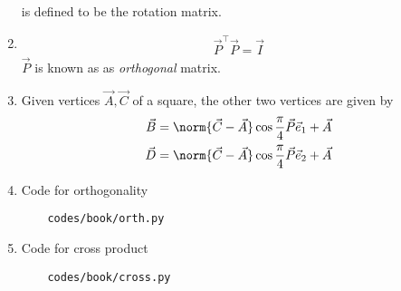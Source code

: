 \begin{enumerate}[label=\thesubsection.\arabic*.,ref=\thesubsection.\theenumi]
\begin{align}
{}
\end{align}
is defined to be the rotation matrix. 
\item 
\begin{align}
	\vec{P}^{\top} \vec{P} = \vec{I}
\end{align}
		$\vec{P}$ is known as as {\em orthogonal} matrix.
\item Given vertices $\vec{A}, \vec{C}$ of a square, the other two vertices are given by
\begin{align}
\begin{split}
	\vec{B} = \norm{\vec{C}-\vec{A}}\cos \frac{\pi}{4}\vec{P}\vec{e}_1+\vec{A}
	\\
	\vec{D} = \norm{\vec{C}-\vec{A}}\cos \frac{\pi}{4}\vec{P}\vec{e}_2+\vec{A}
\end{split}
	\label{eq:affine-square-bd}
\end{align}
\item Code for orthogonality
	\begin{lstlisting}
	codes/book/orth.py
\end{lstlisting}
\item Code for cross product
	\begin{lstlisting}
	codes/book/cross.py
\end{lstlisting}
\iffalse
	\\
		\solution Shifting $\vec{A}$ to the origin and rotating the square clockwise by an angle $\phi$ made by $CA$ with the $x$-axis,
	from \eqref{eq:conic_affine},
\begin{align}
\vec{A} = \vec{P}\vec{0}+\vec{c}
\\
\implies 
\vec{c} = \vec{A}
\\
	\theta =  \phi -\frac{\pi}{4} 
\end{align}
and we obtain a square with the other vertices as
\begin{align}
\begin{split}
	\vec{B}_1 = \norm{\vec{C}-\vec{A}}\cos \frac{\pi}{4}\vec{e}_1
	\\
	\vec{D}_1 = \norm{\vec{C}-\vec{A}}\cos \frac{\pi}{4}\vec{e}_2
\end{split}
	\label{eq:affine-bd}
\end{align}
	From \eqref{eq:conic_affine}
	and 
	\eqref{eq:affine-bd},
	we obtain \eqref{eq:affine-square-bd}.
	\fi
\end{enumerate}
